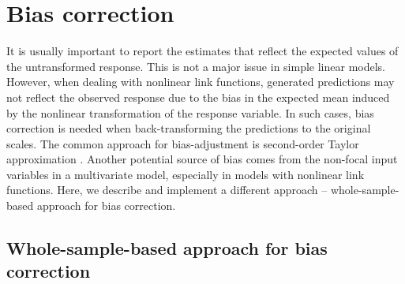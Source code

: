 
\section{Bias correction}

It is usually important to report the estimates that reflect the expected values of the untransformed response. This is not a major issue in simple linear models. However, when dealing with nonlinear link functions,  generated predictions may not reflect the observed response due to the bias in the expected mean induced by the nonlinear transformation of the response variable. In such cases, bias correction is needed when back-transforming the predictions to the original scales. The common approach for bias-adjustment is second-order Taylor approximation \citep{lenth2018package, duursma2003bias}. Another potential source of bias comes from the non-focal input variables in a multivariate model, especially in models with nonlinear link functions. Here, we describe and implement a different approach -- whole-sample-based approach for bias correction.


\subsection{Whole-sample-based approach for bias correction}

